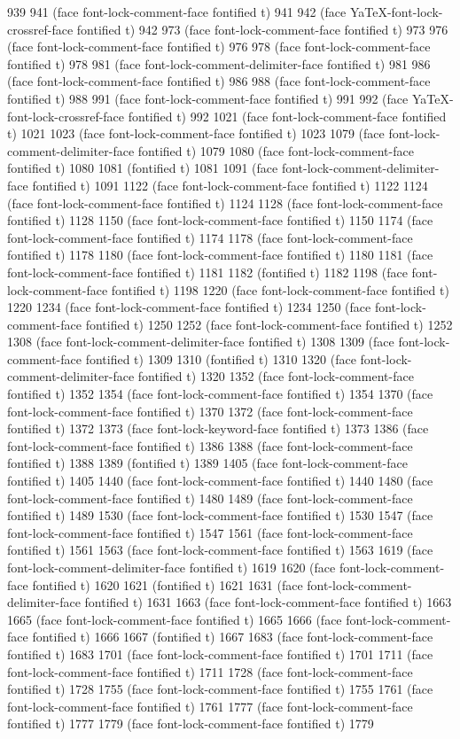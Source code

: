 {939 941 (face font-lock-comment-face fontified t) 941 942 (face YaTeX-font-lock-crossref-face fontified t) 942 973 (face font-lock-comment-face fontified t) 973 976 (face font-lock-comment-face fontified t) 976 978 (face font-lock-comment-face fontified t) 978 981 (face font-lock-comment-delimiter-face fontified t) 981 986 (face font-lock-comment-face fontified t) 986 988 (face font-lock-comment-face fontified t) 988 991 (face font-lock-comment-face fontified t) 991 992 (face YaTeX-font-lock-crossref-face fontified t) 992 1021 (face font-lock-comment-face fontified t) 1021 1023 (face font-lock-comment-face fontified t) 1023 1079 (face font-lock-comment-delimiter-face fontified t) 1079 1080 (face font-lock-comment-face fontified t) 1080 1081 (fontified t) 1081 1091 (face font-lock-comment-delimiter-face fontified t) 1091 1122 (face font-lock-comment-face fontified t) 1122 1124 (face font-lock-comment-face fontified t) 1124 1128 (face font-lock-comment-face fontified t) 1128 1150 (face font-lock-comment-face fontified t) 1150 1174 (face font-lock-comment-face fontified t) 1174 1178 (face font-lock-comment-face fontified t) 1178 1180 (face font-lock-comment-face fontified t) 1180 1181 (face font-lock-comment-face fontified t) 1181 1182 (fontified t) 1182 1198 (face font-lock-comment-face fontified t) 1198 1220 (face font-lock-comment-face fontified t) 1220 1234 (face font-lock-comment-face fontified t) 1234 1250 (face font-lock-comment-face fontified t) 1250 1252 (face font-lock-comment-face fontified t) 1252 1308 (face font-lock-comment-delimiter-face fontified t) 1308 1309 (face font-lock-comment-face fontified t) 1309 1310 (fontified t) 1310 1320 (face font-lock-comment-delimiter-face fontified t) 1320 1352 (face font-lock-comment-face fontified t) 1352 1354 (face font-lock-comment-face fontified t) 1354 1370 (face font-lock-comment-face fontified t) 1370 1372 (face font-lock-comment-face fontified t) 1372 1373 (face font-lock-keyword-face fontified t) 1373 1386 (face font-lock-comment-face fontified t) 1386 1388 (face font-lock-comment-face fontified t) 1388 1389 (fontified t) 1389 1405 (face font-lock-comment-face fontified t) 1405 1440 (face font-lock-comment-face fontified t) 1440 1480 (face font-lock-comment-face fontified t) 1480 1489 (face font-lock-comment-face fontified t) 1489 1530 (face font-lock-comment-face fontified t) 1530 1547 (face font-lock-comment-face fontified t) 1547 1561 (face font-lock-comment-face fontified t) 1561 1563 (face font-lock-comment-face fontified t) 1563 1619 (face font-lock-comment-delimiter-face fontified t) 1619 1620 (face font-lock-comment-face fontified t) 1620 1621 (fontified t) 1621 1631 (face font-lock-comment-delimiter-face fontified t) 1631 1663 (face font-lock-comment-face fontified t) 1663 1665 (face font-lock-comment-face fontified t) 1665 1666 (face font-lock-comment-face fontified t) 1666 1667 (fontified t) 1667 1683 (face font-lock-comment-face fontified t) 1683 1701 (face font-lock-comment-face fontified t) 1701 1711 (face font-lock-comment-face fontified t) 1711 1728 (face font-lock-comment-face fontified t) 1728 1755 (face font-lock-comment-face fontified t) 1755 1761 (face font-lock-comment-face fontified t) 1761 1777 (face font-lock-comment-face fontified t) 1777 1779 (face font-lock-comment-face fontified t) 1779 }
